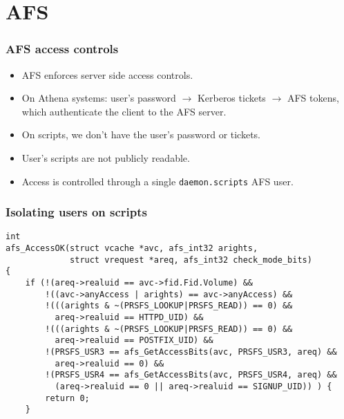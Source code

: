 \section{AFS}

\begin{frame}
  \frametitle{AFS access controls}
  \begin{itemize}
  \item AFS enforces server side access controls.
  \item On Athena systems: user's password $\to$ Kerberos tickets
    $\to$ AFS tokens, which authenticate the client to the AFS server.
  \item On scripts, we don't have the user's password or tickets.
  \item User's scripts are not publicly readable.
  \item Access is controlled through a single {\tt daemon.scripts} AFS
    user.
  \end{itemize}
\end{frame}

\begin{frame}
  \frametitle{Isolating users on scripts}

\begin{footnotesize}
\begin{verbatim}
int
afs_AccessOK(struct vcache *avc, afs_int32 arights,
             struct vrequest *areq, afs_int32 check_mode_bits)
{
    if (!(areq->realuid == avc->fid.Fid.Volume) &&
        !((avc->anyAccess | arights) == avc->anyAccess) &&
        !(((arights & ~(PRSFS_LOOKUP|PRSFS_READ)) == 0) &&
          areq->realuid == HTTPD_UID) &&
        !(((arights & ~(PRSFS_LOOKUP|PRSFS_READ)) == 0) &&
          areq->realuid == POSTFIX_UID) &&
        !(PRSFS_USR3 == afs_GetAccessBits(avc, PRSFS_USR3, areq) &&
          areq->realuid == 0) &&
        !(PRSFS_USR4 == afs_GetAccessBits(avc, PRSFS_USR4, areq) &&
          (areq->realuid == 0 || areq->realuid == SIGNUP_UID)) ) {
        return 0;
    }
\end{verbatim}
\end{footnotesize}
\end{frame}

